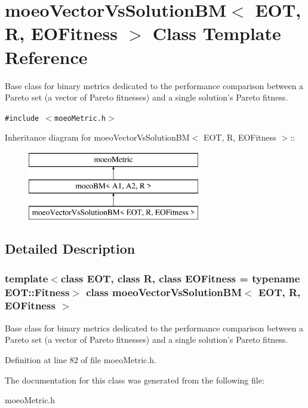 \section{moeo\-Vector\-Vs\-Solution\-BM$<$ EOT, R, EOFitness $>$ Class Template Reference}
\label{classmoeoVectorVsSolutionBM}
Base class for binary metrics dedicated to the performance comparison between a Pareto set (a vector of Pareto fitnesses) and a single solution's Pareto fitness.  


{\tt \#include $<$moeo\-Metric.h$>$}

Inheritance diagram for moeo\-Vector\-Vs\-Solution\-BM$<$ EOT, R, EOFitness $>$::\begin{figure}[H]
\begin{center}
\leavevmode
\includegraphics[height=3cm]{classmoeoVectorVsSolutionBM}
\end{center}
\end{figure}


\subsection{Detailed Description}
\subsubsection*{template$<$class EOT, class R, class EOFitness = typename EOT::Fitness$>$ class moeo\-Vector\-Vs\-Solution\-BM$<$ EOT, R, EOFitness $>$}

Base class for binary metrics dedicated to the performance comparison between a Pareto set (a vector of Pareto fitnesses) and a single solution's Pareto fitness. 



Definition at line 82 of file moeo\-Metric.h.

The documentation for this class was generated from the following file:\begin{CompactItemize}
\item 
moeo\-Metric.h\end{CompactItemize}
